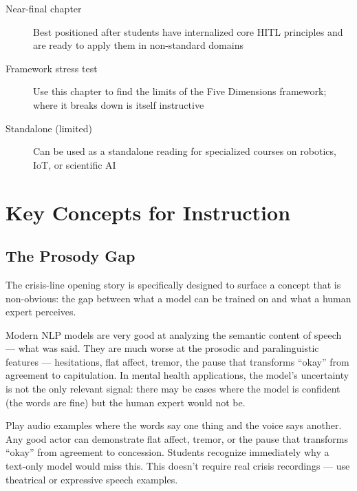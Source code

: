 \begin{description}
    \item[Near-final chapter] Best positioned after students have internalized core HITL principles and are ready to apply them in non-standard domains
    \item[Framework stress test] Use this chapter to find the limits of the Five Dimensions framework; where it breaks down is itself instructive
    \item[Standalone (limited)] Can be used as a standalone reading for specialized courses on robotics, IoT, or scientific AI
\end{description}

\section{Key Concepts for Instruction}

\subsection{The Prosody Gap}

The crisis-line opening story is specifically designed to surface a concept that is non-obvious: the gap between what a model can be trained on and what a human expert perceives.

\begin{keyconcept}
Modern NLP models are very good at analyzing the semantic content of speech --- what was said. They are much worse at the prosodic and paralinguistic features --- hesitations, flat affect, tremor, the pause that transforms ``okay'' from agreement to capitulation. In mental health applications, the model's uncertainty is not the only relevant signal: there may be cases where the model is confident (the words are fine) but the human expert would not be.
\end{keyconcept}

\begin{technote}
Play audio examples where the words say one thing and the voice says another. Any good actor can demonstrate flat affect, tremor, or the pause that transforms ``okay'' from agreement to concession. Students recognize immediately why a text-only model would miss this. This doesn't require real crisis recordings --- use theatrical or expressive speech examples.
\end{technote}

